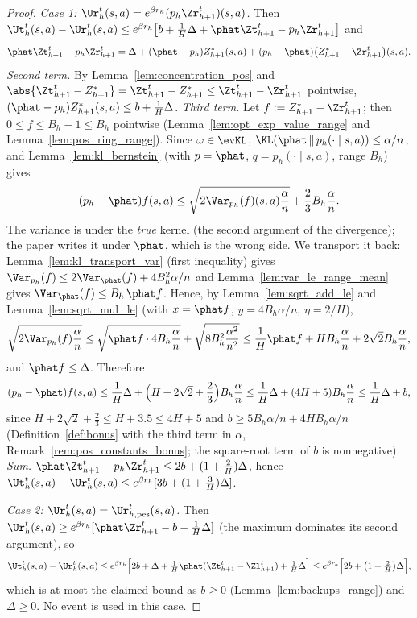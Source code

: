 \begin{proof}
\emph{Case 1: $\Ur_h^t(s,a) = e^{\beta r_h}(p_h\Zr^t_{h+1})(s,a)$.} Then
$\Ut_h^t(s,a) - \Ur_h^t(s,a) \le e^{\beta r_h}\big[b + \frac1H\Delta + \phat\Zt^t_{h+1} - p_h\Zr^t_{h+1}\big]$ and
\[
  \phat\Zt^t_{h+1} - p_h\Zr^t_{h+1}
  = \Delta + (\phat - p_h)Z^*_{h+1}(s,a) + (p_h - \phat)\big(Z^*_{h+1} - \Zr^t_{h+1}\big)(s,a) .
\]
\emph{Second term.} By Lemma~\ref{lem:concentration_pos} and $\abs{\Zt^t_{h+1} - Z^*_{h+1}} = \Zt^t_{h+1} - Z^*_{h+1} \le \Zt^t_{h+1} - \Zr^t_{h+1}$
pointwise, $(\phat - p_h)Z^*_{h+1}(s,a) \le b + \frac1H\Delta$.
\emph{Third term.} Let $f := Z^*_{h+1} - \Zr^t_{h+1}$; then $0 \le f \le B_h - 1 \le B_h$ pointwise
(Lemma~\ref{lem:opt_exp_value_range} and Lemma~\ref{lem:pos_ring_range}). Since $\omega \in \evKL$,
$\KL(\phat\,\|\,p_h(\cdot\mid s,a)) \le \alpha/n$, and Lemma~\ref{lem:kl_bernstein} (with $p = \phat$,
$q = p_h(\cdot \mid s,a)$, range $B_h$) gives
\[
  (p_h - \phat) f(s,a) \le \sqrt{2\Var_{p_h}(f)(s,a)\frac{\alpha}{n}} + \frac23 B_h\frac{\alpha}{n} .
\]
The variance is under the \emph{true} kernel (the second argument of the divergence); the
paper writes it under $\phat$, which is the wrong side. We transport it back:
Lemma~\ref{lem:kl_transport_var} (first inequality) gives $\Var_{p_h}(f) \le 2\Var_{\phat}(f) + 4B_h^2\alpha/n$
and Lemma~\ref{lem:var_le_range_mean} gives $\Var_{\phat}(f) \le B_h\,\phat f$. Hence, by
Lemma~\ref{lem:sqrt_add_le} and Lemma~\ref{lem:sqrt_mul_le} (with $x = \phat f$, $y = 4B_h\alpha/n$,
$\eta = 2/H$),
\[
  \sqrt{2\Var_{p_h}(f)\frac{\alpha}{n}}
  \le \sqrt{\phat f \cdot 4 B_h \frac{\alpha}{n}} + \sqrt{8 B_h^2\frac{\alpha^2}{n^2}}
  \le \frac1H \phat f + H B_h\frac{\alpha}{n} + 2\sqrt2 B_h \frac{\alpha}{n} ,
\]
and $\phat f \le \Delta$. Therefore
\[
  (p_h - \phat)f(s,a) \le \frac1H\Delta + \Big(H + 2\sqrt2 + \frac23\Big) B_h\frac{\alpha}{n}
  \le \frac1H\Delta + (4H + 5) B_h \frac{\alpha}{n} \le \frac1H \Delta + b ,
\]
since $H + 2\sqrt2 + \frac23 \le H + 3.5 \le 4H + 5$ and $b \ge 5B_h\alpha/n + 4HB_h\alpha/n$
(Definition~\ref{def:bonus} with the third term in $\alpha$, Remark~\ref{rem:pos_constants_bonus};
the square-root term of $b$ is nonnegative).
\emph{Sum.} $\phat\Zt^t_{h+1} - p_h\Zr^t_{h+1} \le 2b + (1 + \frac2H)\Delta$, hence
$\Ut_h^t(s,a) - \Ur_h^t(s,a) \le e^{\beta r_h}[3b + (1 + \frac3H)\Delta]$.

\emph{Case 2: $\Ur_h^t(s,a) = \Ur^t_{h,\mathrm{pes}}(s,a)$.} Then
$\Ur_h^t(s,a) \ge e^{\beta r_h}[\phat\Zr^t_{h+1} - b - \frac1H\Delta]$ (the maximum dominates its
second argument), so
\[
  \Ut_h^t(s,a) - \Ur_h^t(s,a) \le e^{\beta r_h}\Big[2b + \Delta + \tfrac1H\phat(\Zt^t_{h+1} - \Zl^t_{h+1}) + \tfrac1H\Delta\Big]
  \le e^{\beta r_h}\Big[2b + \big(1 + \tfrac2H\big)\Delta\Big] ,
\]
which is at most the claimed bound as $b \ge 0$ (Lemma~\ref{lem:backups_range}) and $\Delta \ge 0$.
No event is used in this case.
\end{proof}

